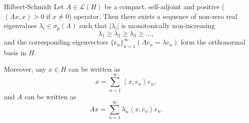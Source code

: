 \documentclass{report}
\begin{document}
\begin{theorem}{Hilbert-Schmidt}{}
    Let \(A \in \mathcal{L}(H)\) be a compact, self-adjoint and positive (\((Ax, x) > 0\) if \(x \neq 0\)) operator. Then there exists a sequence of non-zero real eigenvalues \(\lambda_{i} \in \sigma_{p}(A)\) such that \(\vert \lambda_{i} \vert \) is monotonically non-increasing
    \[
        \lambda_{1} \geq \lambda_{2} \geq \lambda_{3} \geq \dots,
    \]
    and the corresponding eigenvectors \(\{e_{n}\}_{n=1}^{\infty} (Ae_{n} = \lambda e_{n})\) form the orthonormal basis in \(H\).

    Moreover, any \(x \in H\) can be written as
    \[
        x = \sum_{n=1}^{\infty} \left\langle x, e_{n} \right\rangle e_{n},
    \]
    and \(A\) can be written as
    \[
        Ax = \sum_{n=1}^{\infty} \lambda_{n} \left\langle x, e_{n} \right\rangle e_{n}.
    \]
\end{theorem}
\end{document}
